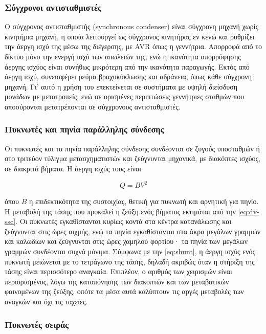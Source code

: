\subsubsection{Σύγχρονοι αντισταθμιστές}

Ο σύγχρονος αντισταθμιστής (synchronous condenser) είναι σύγχρονη μηχανή χωρίς κινητήρια
μηχανή, η οποία λειτουργεί ως σύγχρονος κινητήρας εν κενώ και ρυθμίζει την άεργη ισχύ της
μέσω της διέγερσης, με AVR όπως η γεννήτρια. Απορροφά από το δίκτυο μόνο την ενεργή ισχύ των
απωλειών της, ενώ η ικανότητα απορρόφησης άεργης ισχύος είναι συνήθως μικρότερη από την
ικανότητα παραγωγής. Εκτός από άεργη ισχύ, συνεισφέρει ρεύμα βραχυκύκλωσης και αδράνεια,
όπως κάθε σύγχρονη μηχανή. Γι' αυτό η χρήση του επεκτείνεται σε συστήματα με υψηλή διείσδυση
μονάδων με μετατροπείς, ενώ σε ορισμένες περιπτώσεις γεννήτριες σταθμών που αποσύρονται
μετατρέπονται σε σύγχρονους αντισταθμιστές.

\subsubsection{Πυκνωτές και πηνία παράλληλης σύνδεσης}

Οι πυκνωτές και τα πηνία παράλληλης σύνδεσης συνδέονται σε ζυγούς υποσταθμών ή στο τριτεύον
τύλιγμα μετασχηματιστών και ζεύγνυνται μηχανικά, με διακόπτες ισχύος, σε διακριτά βήματα. Η
άεργη ισχύς τους είναι

\begin{equation}
Q = B V^2
\label{eq:shunt}
\end{equation}

όπου $B$ η επιδεκτικότητα της συστοιχίας, θετική για πυκνωτή και αρνητική για πηνίο. Η
μεταβολή της τάσης που προκαλεί η ζεύξη ενός βήματος εκτιμάται από την \eqref{eq:dv-ssc}. Οι
πυκνωτές εγκαθίστανται κυρίως κοντά στα κέντρα κατανάλωσης και ζεύγνυνται στις ώρες αιχμής,
ενώ τα πηνία εγκαθίστανται στα άκρα μεγάλων γραμμών και καλωδίων και ζεύγνυνται στις ώρες
χαμηλού φορτίου· τα πηνία των μεγάλων γραμμών συνδέονται συχνά μόνιμα. Σύμφωνα με την
\eqref{eq:shunt}, η άεργη ισχύς ενός πυκνωτή μειώνεται με το τετράγωνο της τάσης, δηλαδή
ακριβώς όταν η στήριξη της τάσης είναι περισσότερο αναγκαία. Επιπλέον, ο αριθμός των χειρισμών
είναι περιορισμένος, λόγω της καταπόνησης των διακοπτών και των μεταβατικών φαινομένων της
ζεύξης, οπότε τα μέσα αυτά καλύπτουν τις αργές μεταβολές των αναγκών και όχι τις ταχείες.

\subsubsection{Πυκνωτές σειράς}

